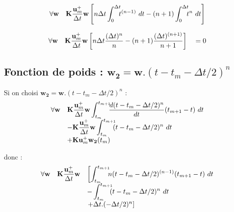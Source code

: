 \documentclass[12pt,a4paper]{report}
\begin{document}
\begin{equation}
\begin{array}{r l}
	\forall \mathbf{w}
	&\displaystyle
	 \mathbf{K} \frac{\mathbf{u}_m^+}{\Delta t} \mathbf{w}
	 	\left[
	 	  n\Delta t \int_{0}^{\Delta t} \!\!\! t^{(n-1)} ~dt
	 	 -(n+1)\int_{0}^{\Delta t} \!\!\! t^n ~dt
	 	\right]
\end{array}
\end{equation}

\begin{equation}
\begin{array}{r l}
	\forall \mathbf{w}
	&\displaystyle
	 \mathbf{K} \frac{\mathbf{u}_m^+}{\Delta t} \mathbf{w}
	 	\left[
	 	  n\Delta t \frac{(\Delta t)^n}{n} 
	 	 -(n+1) \frac{(\Delta t)^{(n+1)}}{n+1}
	 	\right]
	 	~~~ = 0
\end{array}
\end{equation}

\subsection{Fonction de poids : $\mathbf{w_2} = \mathbf{w}.(t-t_m- \Delta t/2)^n$}

Si on choisi $\mathbf{w_2} = \mathbf{w}.(t-t_m- \Delta t/2)^n$ :
\begin{equation}
\begin{array}{r l}
	\forall \mathbf{w}
	&\displaystyle
	 \mathbf{K} \frac{\mathbf{u}_m^+}{\Delta t} \mathbf{w} 
	 	\int_{t_m}^{t_{m+1}} \!\!\! \frac{d(t-t_m- \Delta t/2)^n}{dt}		
			(t_{m+1}-t) ~dt
	\\
	  &\displaystyle	
	   - \mathbf{K} \frac{ \mathbf{u}_m^+ }{\Delta t} \mathbf{w}
	   		\int_{t_m}^{t_{m+1}} \!\!\!  (t-t_m- \Delta t/2)^n 	~dt 
	\\
	  &+ \mathbf{K} \mathbf{u}_m^+  \mathbf{w_2}(t_m)
\end{array}
\end{equation}

donc :
\begin{equation}
\begin{array}{r l l}
	\forall \mathbf{w}
	&\displaystyle
	 \mathbf{K} \frac{\mathbf{u}_m^+}{\Delta t} \mathbf{w}	 	
	 		&\left[ \displaystyle
	 	  		\int_{t_m}^{t_{m+1}} \!\!\! 
	 	  			n(t-t_m- \Delta t/2)^{(n-1)}(t_{m+1}-t) ~dt
	 	  	\right.
	 	\\&	& \displaystyle
	 	 		-\int_{t_m}^{t_{m+1}} \!\!\!  (t-t_m- \Delta t/2)^n 	~dt
	 	\\&	&\left. + \Delta t .(-\Delta t/2)^n
	 	\right]
\end{array}
\end{equation}
\end{document}
